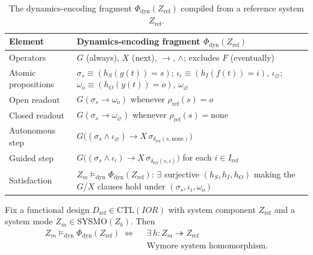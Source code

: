 \begin{table}[t]
\caption{The dynamics-encoding fragment $\Phi_{\mathrm{dyn}}(Z_{\mathrm{ref}})$ compiled from a reference system $Z_{\mathrm{ref}}$.}
\label{tab:phi-dyn-fragment}
\renewcommand{\arraystretch}{1.25}
\footnotesize
\begin{tabularx}{\textwidth}{@{}A{0.22\textwidth} >{\raggedright\arraybackslash}X@{}}
    \toprule
    \textbf{Element} & \textbf{Dynamics-encoding fragment $\Phi_{\mathrm{dyn}}(Z_{\mathrm{ref}})$} \\
    \midrule
    Operators & $G$ (always), $X$ (next), $\rightarrow$, $\wedge$; excludes $F$ (eventually) \\
    Atomic propositions & $\sigma_s \equiv (h_S(g(t))=s)$; $\iota_i \equiv (h_I(f(t))=i)$, $\iota_\varnothing$; $\omega_o \equiv (h_O(y(t))=o)$, $\omega_\varnothing$ \\
    Open readout & $G(\sigma_s \rightarrow \omega_o)$ whenever $\rho_{\mathrm{ref}}(s)=o$ \\
    Closed readout & $G(\sigma_s \rightarrow \omega_\varnothing)$ whenever $\rho_{\mathrm{ref}}(s)=\mathrm{none}$ \\
    Autonomous step & $G\bigl((\sigma_s\wedge\iota_\varnothing) \rightarrow X\,\sigma_{\delta_{\mathrm{ref}}(s,\mathrm{none})}\bigr)$ \\
    Guided step & $G\bigl((\sigma_s\wedge\iota_i) \rightarrow X\,\sigma_{\delta_{\mathrm{ref}}(s,i)}\bigr)$ for each $i\in I_{\mathrm{ref}}$ \\
    Satisfaction & $Z_m\models_{\mathrm{dyn}}\Phi_{\mathrm{dyn}}(Z_{\mathrm{ref}})$: $\exists$ surjective $(h_S,h_I,h_O)$ making the $G$/$X$ clauses hold under $(\sigma_s,\iota_i,\omega_o)$ \\
    \bottomrule
\end{tabularx}
\end{table}

\begin{theorem}
\label{thm:dynamics-characterization}
Fix a functional design $D_{\mathrm{ref}}\in\mathrm{CTL}(IOR)$ with system component $Z_{\mathrm{ref}}$ and a system mode $Z_m\in\mathrm{SYSMO}(Z_b)$. Then
\[
\begin{aligned}
  Z_m \models_{\mathrm{dyn}} \Phi_{\mathrm{dyn}}(Z_{\mathrm{ref}})
  \;\Longleftrightarrow\;\;
  &\exists\, h : Z_m \twoheadrightarrow Z_{\mathrm{ref}}\\
  &\text{Wymore system homomorphism}.
\end{aligned}
\]
\end{theorem}

